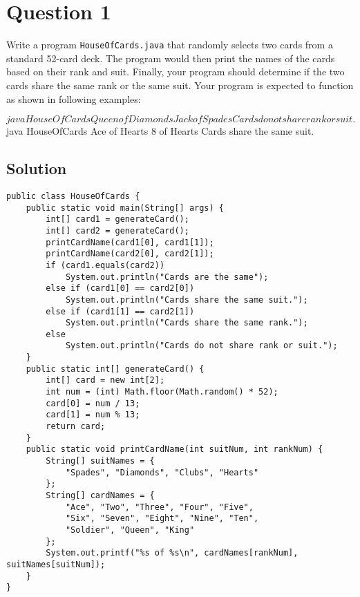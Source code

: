 \documentclass[12pt,letterpaper,twoside]{article}
\begin{document}


\section*{Question 1}

Write a program \texttt{HouseOfCards.java} that randomly selects two cards from a standard 52-card deck.
The program would then print the names of the cards based on their rank and suit.
Finally, your program should determine if the two cards share the same rank or the same suit.
Your program is expected to function as shown in following examples:

\begin{terminal}
$ java HouseOfCards
Queen of Diamonds
Jack of Spades
Cards do not share rank or suit.
$ java HouseOfCards
Ace of Hearts
8 of Hearts
Cards share the same suit.
\end{terminal}

\subsection*{Solution}

\lstset{language=Java,tabsize=4}
\begin{lstlisting}
public class HouseOfCards {
	public static void main(String[] args) {
		int[] card1 = generateCard();
		int[] card2 = generateCard();
		printCardName(card1[0], card1[1]);
		printCardName(card2[0], card2[1]);
		if (card1.equals(card2))
			System.out.println("Cards are the same");
		else if (card1[0] == card2[0])
			System.out.println("Cards share the same suit.");
		else if (card1[1] == card2[1])
			System.out.println("Cards share the same rank.");
		else
			System.out.println("Cards do not share rank or suit.");
	}
	public static int[] generateCard() {
		int[] card = new int[2];
		int num = (int) Math.floor(Math.random() * 52);
		card[0] = num / 13;
		card[1] = num % 13;
		return card;
	}
	public static void printCardName(int suitNum, int rankNum) {
		String[] suitNames = {
			"Spades", "Diamonds", "Clubs", "Hearts"
		};
		String[] cardNames = {
			"Ace", "Two", "Three", "Four", "Five",
			"Six", "Seven", "Eight", "Nine", "Ten",
			"Soldier", "Queen", "King"
		};
		System.out.printf("%s of %s\n", cardNames[rankNum], suitNames[suitNum]);
	}
}
\end{lstlisting}
\end{document}

